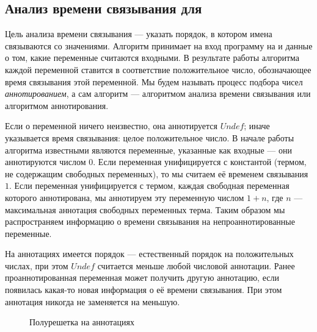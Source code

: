 \subsection{Анализ времени связывания для \miniKanren{}}

Цель анализа времени связывания --- указать порядок, в котором имена связываются со значениями.
Алгоритм принимает на вход программу на \miniKanren{} и данные о том, какие переменные считаются входными. 
В результате работы алгоритма каждой переменной ставится в соответствие положительное число, обозначающее время связывания этой переменной.
Мы будем называть процесс подбора чисел \emph{аннотированием}, а сам алгоритм --- алгоритмом анализа времени связывания или алгоритмом аннотирования.

Если о переменной ничего неизвестно, она аннотируется $Undef$; иначе указывается время связывания: целое положительное число.
В начале работы алгоритма известными являются переменные, указанные как входные --- они аннотируются числом $0$.
Если переменная унифицируется с константой (термом, не содержащим свободных переменных), то мы считаем её временем связывания $1$.
Если переменная унифицируется с термом, каждая свободная переменная которого аннотирована, мы аннотируем эту переменную числом $1+n$, где $n$ --- максимальная аннотация свободных переменных терма. 
Таким образом мы распространяем информацию о времени связывания на непроаннотированные переменные.

На аннотациях имеется порядок --- естественный порядок на положительных числах, при этом $Undef$ считается меньше любой числовой аннотации.
Ранее проаннотированная переменная может получить другую аннотацию, если появилась какая-то новая информация о её времени связывания.
При этом аннотация никогда не заменяется на меньшую. 

\begin{figure}[htbp]
  \centering
  \caption{Полурешетка на аннотациях}
  \label{fig:semilattice}
\end{figure}
